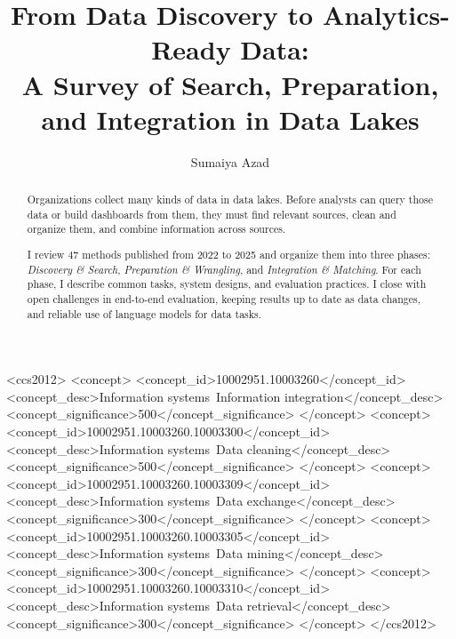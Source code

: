 \documentclass[sigconf]{acmart}
\date{}
\begin{document}
\pagestyle{plain}

\title[Survey of Data Discovery to Integration in Data Lakes]%
{From Data Discovery to Analytics-Ready Data:\\A Survey of Search, Preparation, and Integration in Data Lakes}

\author{Sumaiya Azad}

\renewcommand{\shortauthors}{Azad}



\begin{abstract}
Organizations collect many kinds of data in data lakes. Before analysts can query those data or build dashboards from them, they must find relevant sources, clean and organize them, and combine information across sources.

I review 47 methods published from 2022 to 2025 and organize them into three phases: \emph{Discovery \& Search}, \emph{Preparation \& Wrangling}, and \emph{Integration \& Matching}. For each phase, I describe common tasks, system designs, and evaluation practices. I close with open challenges in end-to-end evaluation, keeping results up to date as data changes, and reliable use of language models for data tasks.
\end{abstract}

\begin{CCSXML}
<ccs2012>
 <concept>
  <concept_id>10002951.10003260</concept_id>
  <concept_desc>Information systems~Information integration</concept_desc>
  <concept_significance>500</concept_significance>
 </concept>
 <concept>
  <concept_id>10002951.10003260.10003300</concept_id>
  <concept_desc>Information systems~Data cleaning</concept_desc>
  <concept_significance>500</concept_significance>
 </concept>
 <concept>
  <concept_id>10002951.10003260.10003309</concept_id>
  <concept_desc>Information systems~Data exchange</concept_desc>
  <concept_significance>300</concept_significance>
 </concept>
 <concept>
  <concept_id>10002951.10003260.10003305</concept_id>
  <concept_desc>Information systems~Data mining</concept_desc>
  <concept_significance>300</concept_significance>
 </concept>
 <concept>
  <concept_id>10002951.10003260.10003310</concept_id>
  <concept_desc>Information systems~Data retrieval</concept_desc>
  <concept_significance>300</concept_significance>
 </concept>
</ccs2012>
\end{CCSXML}
\end{document}
